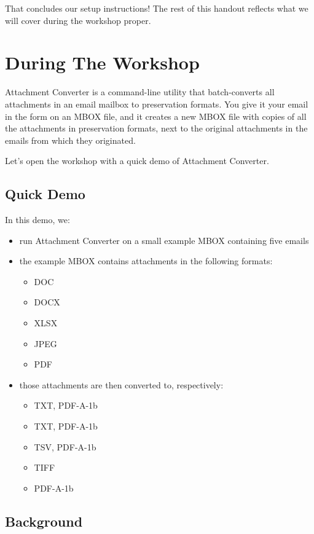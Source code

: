 \documentclass[11pt]{article}
\begin{document}
That concludes our setup instructions!  The rest of this handout
reflects what we will cover during the workshop proper.

\section{During The Workshop \label{org9483028}}
\label{sec:orgd891b46}

Attachment Converter is a command-line utility that batch-converts all
attachments in an email mailbox to preservation formats.  You give it
your email in the form on an MBOX file, and it creates a new MBOX file
with copies of all the attachments in preservation formats, next to
the original attachments in the emails from which they originated.

Let's open the workshop with a quick demo of Attachment Converter.

\subsection{Quick Demo}
\label{sec:org8bdb0f2}

In this demo, we:

\begin{itemize}
\item run Attachment Converter on a small example MBOX containing five
emails
\item the example MBOX contains attachments in the following formats:
\begin{itemize}
\item DOC
\item DOCX
\item XLSX
\item JPEG
\item PDF
\end{itemize}
\item those attachments are then converted to, respectively:
\begin{itemize}
\item TXT, PDF-A-1b
\item TXT, PDF-A-1b
\item TSV, PDF-A-1b
\item TIFF
\item PDF-A-1b
\end{itemize}
\end{itemize}

\subsection{Background}
\label{sec:orgaffb7aa}
\end{document}
